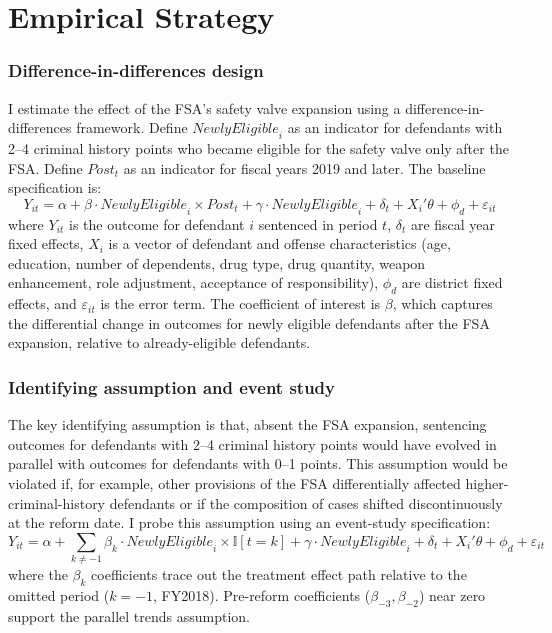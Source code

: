 \documentclass[12pt]{article}
\newcommand{\ind}{\mathbb{I}}
\begin{document}



\section{Empirical Strategy}

\subsubsection*{Difference-in-differences design}
I estimate the effect of the FSA's safety valve expansion using a difference-in-differences framework. Define $\mathit{NewlyEligible}_i$ as an indicator for defendants with 2--4 criminal history points who became eligible for the safety valve only after the FSA. Define $\mathit{Post}_t$ as an indicator for fiscal years 2019 and later. The baseline specification is:
\begin{equation}
Y_{it} = \alpha + \beta \cdot \mathit{NewlyEligible}_i \times \mathit{Post}_t + \gamma \cdot \mathit{NewlyEligible}_i + \delta_t + X_i'\theta + \phi_d + \varepsilon_{it}
\label{eq:did}
\end{equation}
where $Y_{it}$ is the outcome for defendant $i$ sentenced in period $t$, $\delta_t$ are fiscal year fixed effects, $X_i$ is a vector of defendant and offense characteristics (age, education, number of dependents, drug type, drug quantity, weapon enhancement, role adjustment, acceptance of responsibility), $\phi_d$ are district fixed effects, and $\varepsilon_{it}$ is the error term. The coefficient of interest is $\beta$, which captures the differential change in outcomes for newly eligible defendants after the FSA expansion, relative to already-eligible defendants.

\subsubsection*{Identifying assumption and event study}
The key identifying assumption is that, absent the FSA expansion, sentencing outcomes for defendants with 2--4 criminal history points would have evolved in parallel with outcomes for defendants with 0--1 points. This assumption would be violated if, for example, other provisions of the FSA differentially affected higher-criminal-history defendants or if the composition of cases shifted discontinuously at the reform date. I probe this assumption using an event-study specification:
\begin{equation}
Y_{it} = \alpha + \sum_{k \neq -1} \beta_k \cdot \mathit{NewlyEligible}_i \times \ind[t = k] + \gamma \cdot \mathit{NewlyEligible}_i + \delta_t + X_i'\theta + \phi_d + \varepsilon_{it}
\label{eq:eventstudy}
\end{equation}
where the $\beta_k$ coefficients trace out the treatment effect path relative to the omitted period ($k = -1$, FY2018). Pre-reform coefficients ($\beta_{-3}, \beta_{-2}$) near zero support the parallel trends assumption.
\end{document}
